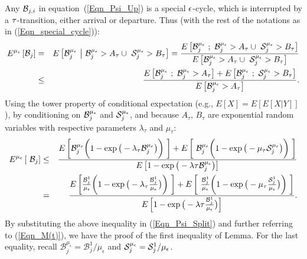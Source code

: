Any $\B_{j,i}$ in equation~(\ref{Eqn_Psi_Up}) is a special $\i$-cycle,  which is interrupted by a $\t$-transition, either arrival or departure. Thus (with the rest of the notations
as in (\ref{Eqn_special_cycle})): 
\begin{eqnarray*}
	E^{\mu_\epsilon} \left[  \B_j \right] &=& E \left[ \mathcal B_j^{\mu_\epsilon} \ \big | \  \mathcal B_j^{\mu_\epsilon}  > A_\tau \cup \  \S_j^{\mu_\epsilon}  >   B_\tau  \right] 
	= \frac{E \left[\mathcal B_j^{\mu_\epsilon}  \ ; \  \mathcal B_j^{\mu_\epsilon}  > A_\tau \cup \  \S_j^{\mu_\epsilon}  >   B_\tau  \right]}{E \left[\mathcal B_j^{\mu_\epsilon} > A_\tau \cup \  \S_j^{\mu_\epsilon}  >   B_\tau  \right]}
	\\
	&\leq & \frac{E \left[ \mathcal{ B}_j^{\mu_\epsilon}  \  ; \  \mathcal{B}_j^{\mu_\epsilon}  > A_\tau \right] + E \left[   \mathcal{B}_j^{\mu_\epsilon}  \ ; \ \S_j^{\mu_\epsilon}  >   B_\tau  \right]}{E \left[ \mathcal{B}_j^{\mu_\epsilon} > A_\tau \right]}.
\end{eqnarray*}Using the tower property of conditional expectation  (e.g., $E[X] = E[E[X|Y] ]$), by conditioning on $\B_j^{\mu_\epsilon}$ and $ \S_j^{\mu_\epsilon}$,  and because $A_\tau$, $B_\tau$
are exponential random variables with respective parameters $\lambda_\tau$ and $\mu_\tau$:  
%
%
\begin{eqnarray*} 
	E^{\mu_\epsilon} \left[ \  \B_j \right] &\le &
	\frac{E \left[ \mathcal B_j^{\mu_\epsilon} \bigg(1 - \exp \big(- \lambda_\tau \mathcal B_j^{\mu_\epsilon} \big) \bigg) \ \right] + E \left[ \ \mathcal B_j^{\mu_\epsilon}  \bigg(1 - \exp \big(- \mu_\tau \S_j^{\mu_\epsilon} \big) \bigg) \ \right]}{E\left[ 1 - \exp \big(- \lambda\tau  \mathcal B_j^{\mu_\epsilon} \big) \right]} \\
	&=& \frac{E \left[ \frac{\mathcal B_j^1}{\mu_\epsilon} \bigg(1 - \exp \big(-\lambda_\tau \frac{\mathcal B_j^1}{\mu_\epsilon} \big)\bigg) \ \right] + E \left[ \ \frac{\mathcal B_j^1}{\mu_\epsilon}  \bigg(1 - \exp \big( -\mu_\tau \frac{\S_j^1}{\mu_\epsilon} \big)\bigg) \ \right]}{E\left[ 1 - \exp \big(-\lambda\tau \frac{\mathcal B_j^1}{\mu_\epsilon} \big)\right]} .
\end{eqnarray*}
By substituting the above inequality in (\ref{Eqn_Psi_Split}) and further referring to  (\ref{Eqn_M(t)}), we have the proof of the first inequality of Lemma.
For the last equality,   recall $\mathcal B_j^{\mu_\epsilon}  = \mathcal B_j^1 / \mu_\epsilon$ and $\S_j^{\mu_\epsilon} = \S_j^1 / \mu_\epsilon$.

